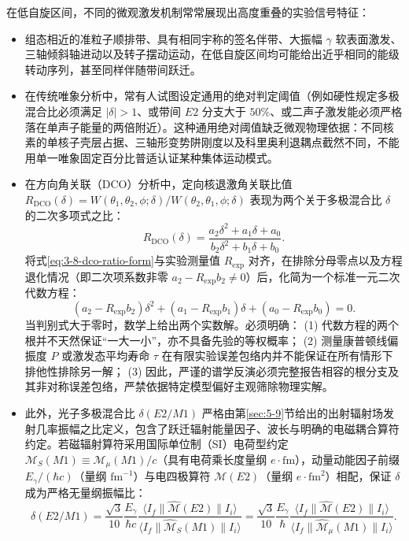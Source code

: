 在低自旋区间，不同的微观激发机制常常展现出高度重叠的实验信号特征：
\begin{itemize}
\item 组态相近的准粒子顺排带、具有相同宇称的签名伴带、大振幅 $\gamma$ 软表面激发、三轴倾斜轴进动以及转子摆动运动，在低自旋区间均可能给出近乎相同的能级转动序列，甚至同样伴随带间跃迁。
\item 在传统唯象分析中，常有人试图设定通用的绝对判定阈值（例如硬性规定多极混合比必须满足 $|\delta| > 1$、或带间 $E2$ 分支大于 $50\%$、或二声子激发能必须严格落在单声子能量的两倍附近）。这种通用绝对阈值缺乏微观物理依据：不同核素的单核子壳层占据、三轴形变势阱刚度以及科里奥利退耦点截然不同，不能用单一唯象固定百分比普适认证某种集体运动模式。
\item 在方向角关联（DCO）分析中，定向核退激角关联比值 $R_{\mathrm{DCO}}(\delta) = W(\theta_1, \theta_2, \phi; \delta) / W(\theta_2, \theta_1, \phi; \delta)$ 表现为两个关于多极混合比 $\delta$ 的二次多项式之比：
\begin{equation}\label{eq:3-8-dco-ratio-form}
R_{\mathrm{DCO}}(\delta) = \frac{a_2 \delta^2 + a_1 \delta + a_0}{b_2 \delta^2 + b_1 \delta + b_0} .
\end{equation}
将式\eqref{eq:3-8-dco-ratio-form}与实验测量值 $R_{\mathrm{exp}}$ 对齐，在排除分母零点以及方程退化情况（即二次项系数非零 $a_2 - R_{\mathrm{exp}} b_2 \neq 0$）后，化简为一个标准一元二次代数方程：
\begin{equation}\label{eq:3-8-dco-quadratic-root}
(a_2 - R_{\mathrm{exp}} b_2)\delta^2 + (a_1 - R_{\mathrm{exp}} b_1)\delta + (a_0 - R_{\mathrm{exp}} b_0) = 0 .
\end{equation}
当判别式大于零时，数学上给出两个实数解。必须明确：
(1) 代数方程的两个根并不天然保证“一大一小”，亦不具备先验的等权概率；
(2) 测量康普顿线偏振度 $P$ 或激发态平均寿命 $\tau$ 在有限实验误差包络内并不能保证在所有情形下排他性排除另一解；
(3) 因此，严谨的谱学反演必须完整报告相容的根分支及其非对称误差包络，严禁依据特定模型偏好主观筛除物理实解。
\item 此外，光子多极混合比 $\delta(E2/M1)$ 严格由第\ref{sec:5-9}节给出的出射辐射场发射几率振幅之比定义，包含了跃迁辐射能量因子、波长与明确的电磁耦合算符约定。若磁辐射算符采用国际单位制（SI）电荷型约定 $\mathcal{M}_S(M1) \equiv \mathcal{M}_\mu(M1)/c$（具有电荷乘长度量纲 $e\cdot\mathrm{fm}$），动量动能因子前缀 $E_\gamma/(\hbar c)$（量纲 $\mathrm{fm}^{-1}$）与电四极算符 $\mathcal{M}(E2)$（量纲 $e\cdot\mathrm{fm}^2$）相配，保证 $\delta$ 成为严格无量纲振幅比：
\begin{equation}\label{eq:3-8-delta-def}
\delta(E2/M1) = \frac{\sqrt{3}}{10} \frac{E_\gamma}{\hbar c} \frac{\langle I_f \| \hat{\mathcal{M}}(E2) \| I_i \rangle}{\langle I_f \| \hat{\mathcal{M}}_S(M1) \| I_i \rangle} = \frac{\sqrt{3}}{10} \frac{E_\gamma}{\hbar} \frac{\langle I_f \| \hat{\mathcal{M}}(E2) \| I_i \rangle}{\langle I_f \| \hat{\mathcal{M}}_\mu(M1) \| I_i \rangle} .

\end{equation}
\end{itemize}
